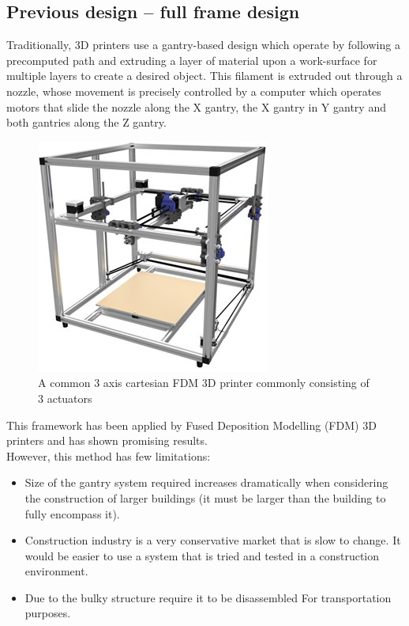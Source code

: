 \documentclass{UoNMCHA}
\numberwithin{equation}{section}
\begin{document}
	\subsection*{Previous design – full frame design}
	Traditionally, 3D printers use a gantry-based design which operate by following a precomputed path and extruding a layer of material upon a work-surface for multiple layers to create a desired object. This filament is extruded out through a nozzle, whose movement is precisely controlled by a computer which operates motors that slide the nozzle along the X gantry, the X gantry in Y gantry and both gantries along the Z gantry. 
	
	\begin{figure}[H]
		\begin{center}
			\includegraphics[width=.8\linewidth]{figs/Picture1}
			\caption{A  common 3 axis cartesian FDM 3D printer commonly consisting of 3 actuators}
			\label{figs/Picture1}
		\end{center}
	\end{figure}
	
	This framework has been applied by Fused Deposition Modelling (FDM) 3D printers and has shown promising results. \\
	However, this method has few limitations:
	
	\begin{itemize}
		\item Size of the gantry system required increases dramatically when considering the construction of larger buildings (it must be larger than the building to fully encompass it).
		\item Construction industry is a very conservative market that is slow to change. It would be easier to use a system that is tried and tested in a construction environment.
		\item Due to the bulky structure require it to be disassembled For transportation purposes.
		
	\end{itemize}
	
\end{document}
